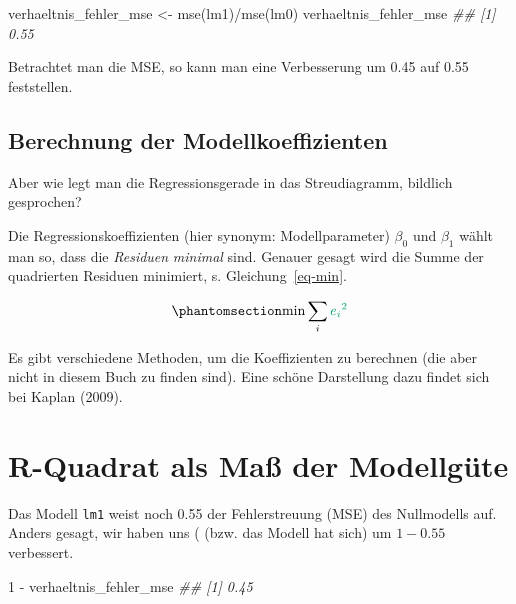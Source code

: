 \documentclass[
  letterpaper,
  twoside,
  open=any]{scrbook}
\newenvironment{Shaded}{\begin{snugshade}}{\end{snugshade}}
\newcommand{\DecValTok}[1]{\textcolor[rgb]{0.68,0.00,0.00}{#1}}
\newcommand{\DocumentationTok}[1]{\textcolor[rgb]{0.37,0.37,0.37}{\textit{#1}}}
\newcommand{\FunctionTok}[1]{\textcolor[rgb]{0.28,0.35,0.67}{#1}}
\newcommand{\NormalTok}[1]{\textcolor[rgb]{0.00,0.23,0.31}{#1}}
\newcommand{\OtherTok}[1]{\textcolor[rgb]{0.00,0.23,0.31}{#1}}
\newcommand{\SpecialCharTok}[1]{\textcolor[rgb]{0.37,0.37,0.37}{#1}}
\theoremstyle{definition}
\theoremstyle{definition}
\theoremstyle{definition}
\theoremstyle{remark}
\begin{document}
\begin{Shaded}
\begin{Highlighting}[]
\NormalTok{verhaeltnis\_fehler\_mse }\OtherTok{\textless{}{-}} \FunctionTok{mse}\NormalTok{(lm1)}\SpecialCharTok{/}\FunctionTok{mse}\NormalTok{(lm0)}
\NormalTok{verhaeltnis\_fehler\_mse}
\DocumentationTok{\#\# [1] 0.55}
\end{Highlighting}
\end{Shaded}

Betrachtet man die MSE, so kann man eine Verbesserung um 0.45 auf 0.55
feststellen.

\subsection{Berechnung der
Modellkoeffizienten}\label{berechnung-der-modellkoeffizienten}

Aber wie legt man die Regressionsgerade in das Streudiagramm, bildlich
gesprochen?

Die Regressionskoeffizienten (hier synonym: Modellparameter) \(\beta_0\)
und \(\beta_1\) wählt man so, dass die \emph{Residuen} \emph{minimal}
sind. Genauer gesagt wird die Summe der quadrierten {Residuen}
minimiert, s. Gleichung~\ref{eq-min}.

\begin{equation}\phantomsection\label{eq-min}{\text{min}\sum_i \color{errorcol}{e_i}^2}\end{equation}

Es gibt verschiedene Methoden, um die Koeffizienten zu berechnen (die
aber nicht in diesem Buch zu finden sind). Eine schöne Darstellung dazu
findet sich bei Kaplan (2009).

\section{R-Quadrat als Maß der
Modellgüte}\label{r-quadrat-als-mauxdf-der-modellguxfcte}

Das Modell \texttt{lm1} weist noch 0.55 der Fehlerstreuung (MSE) des
Nullmodells auf. Anders gesagt, wir haben uns ( (bzw. das Modell hat
sich) um \(1 - 0.55\) verbessert.

\begin{Shaded}
\begin{Highlighting}[]
\DecValTok{1} \SpecialCharTok{{-}}\NormalTok{ verhaeltnis\_fehler\_mse}
\DocumentationTok{\#\# [1] 0.45}
\end{Highlighting}
\end{Shaded}
\end{document}
